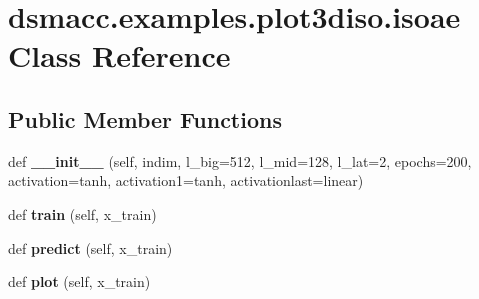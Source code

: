 \hypertarget{classdsmacc_1_1examples_1_1plot3diso_1_1isoae}{}\section{dsmacc.\+examples.\+plot3diso.\+isoae Class Reference}
\label{classdsmacc_1_1examples_1_1plot3diso_1_1isoae}
\subsection*{Public Member Functions}
\begin{DoxyCompactItemize}
\item 
\mbox{\label{classdsmacc_1_1examples_1_1plot3diso_1_1isoae_acbbe6a436d3754c52e9bb0622971c004}} 
def {\bfseries \+\_\+\+\_\+init\+\_\+\+\_\+} (self, indim, l\+\_\+big=512, l\+\_\+mid=128, l\+\_\+lat=2, epochs=200, activation=\textquotesingle{}tanh\textquotesingle{}, activation1=\textquotesingle{}tanh\textquotesingle{}, activationlast=\textquotesingle{}linear\textquotesingle{})
\item 
\mbox{\label{classdsmacc_1_1examples_1_1plot3diso_1_1isoae_a9029c96233c3efd6f05abd21c5d170be}} 
def {\bfseries train} (self, x\+\_\+train)
\item 
\mbox{\label{classdsmacc_1_1examples_1_1plot3diso_1_1isoae_a25da0e09d9415e86b4919a1d5ce3414b}} 
def {\bfseries predict} (self, x\+\_\+train)
\item 
\mbox{\label{classdsmacc_1_1examples_1_1plot3diso_1_1isoae_af6f3ce3342bbb8df4038770929b1275d}} 
def {\bfseries plot} (self, x\+\_\+train)
\end{DoxyCompactItemize}
